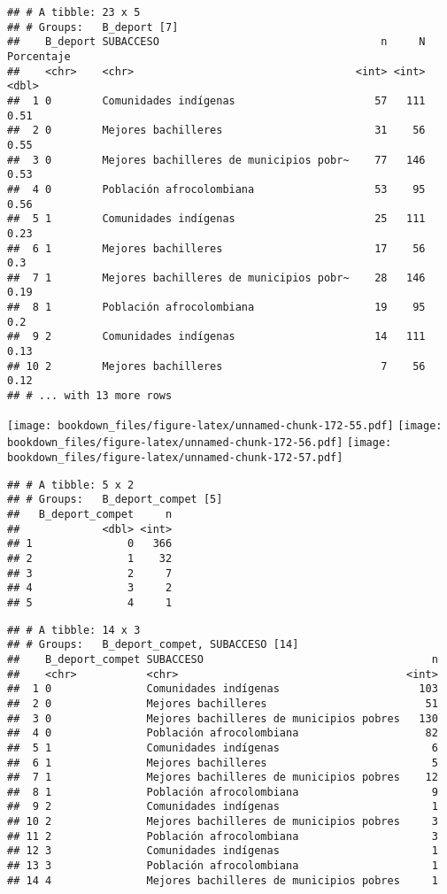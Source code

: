 \documentclass[]{article}
\theoremstyle{definition}
\theoremstyle{definition}
\theoremstyle{definition}
\theoremstyle{remark}
\begin{document}
\begin{verbatim}
## # A tibble: 23 x 5
## # Groups:   B_deport [7]
##    B_deport SUBACCESO                                   n     N Porcentaje
##    <chr>    <chr>                                   <int> <int>      <dbl>
##  1 0        Comunidades indígenas                      57   111       0.51
##  2 0        Mejores bachilleres                        31    56       0.55
##  3 0        Mejores bachilleres de municipios pobr~    77   146       0.53
##  4 0        Población afrocolombiana                   53    95       0.56
##  5 1        Comunidades indígenas                      25   111       0.23
##  6 1        Mejores bachilleres                        17    56       0.3 
##  7 1        Mejores bachilleres de municipios pobr~    28   146       0.19
##  8 1        Población afrocolombiana                   19    95       0.2 
##  9 2        Comunidades indígenas                      14   111       0.13
## 10 2        Mejores bachilleres                         7    56       0.12
## # ... with 13 more rows
\end{verbatim}

\texttt{[image: bookdown\_files/figure-latex/unnamed-chunk-172-55.pdf]}
\texttt{[image: bookdown\_files/figure-latex/unnamed-chunk-172-56.pdf]}
\texttt{[image: bookdown\_files/figure-latex/unnamed-chunk-172-57.pdf]}

\begin{verbatim}
## # A tibble: 5 x 2
## # Groups:   B_deport_compet [5]
##   B_deport_compet     n
##             <dbl> <int>
## 1               0   366
## 2               1    32
## 3               2     7
## 4               3     2
## 5               4     1
\end{verbatim}

\begin{verbatim}
## # A tibble: 14 x 3
## # Groups:   B_deport_compet, SUBACCESO [14]
##    B_deport_compet SUBACCESO                                    n
##    <chr>           <chr>                                    <int>
##  1 0               Comunidades indígenas                      103
##  2 0               Mejores bachilleres                         51
##  3 0               Mejores bachilleres de municipios pobres   130
##  4 0               Población afrocolombiana                    82
##  5 1               Comunidades indígenas                        6
##  6 1               Mejores bachilleres                          5
##  7 1               Mejores bachilleres de municipios pobres    12
##  8 1               Población afrocolombiana                     9
##  9 2               Comunidades indígenas                        1
## 10 2               Mejores bachilleres de municipios pobres     3
## 11 2               Población afrocolombiana                     3
## 12 3               Comunidades indígenas                        1
## 13 3               Población afrocolombiana                     1
## 14 4               Mejores bachilleres de municipios pobres     1
\end{verbatim}
\end{document}
